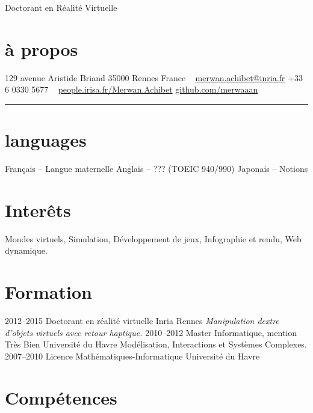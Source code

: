 \documentclass[]{friggeri-cv}
\begin{document}
       {Doctorant en Réalité Virtuelle}
			
\begin{aside}
  \section{à propos}\vspace{.25cm}
    129 avenue Aristide Briand
    35000 Rennes
    France
    ~
    \href{mailto:merwan.achibet@inria.fr}{merwan.achibet@inria.fr}
    +33 6 0330 5677
		~
    \href{http://people.irisa.fr/Merwan.Achibet/}{people.irisa.fr/Merwan.Achibet}
    \href{http://github.com/merwaaan}{github.com/merwaaan}
    {\color{lightergray}\rule{3cm}{0.01cm}}
	\section{languages}\vspace{.25cm}
		Français {\footnotesize -- Langue maternelle}\vspace{.4cm}
		Anglais {\footnotesize -- ???}
		{\footnotesize (TOEIC 940/990)}\vspace{.4cm}
		Japonais {\footnotesize -- Notions}
\end{aside}

\section{Interêts}

Mondes virtuels, Simulation, Développement de jeux, Infographie et rendu, Web dynamique.

\section{Formation}

\begin{entrylist}
  \entry
    {2012–2015}
    {Doctorant en réalité virtuelle}
    {Inria Rennes}
    {\it Manipulation dextre d’objets virtuels avec retour haptique.}
  \entry
    {2010–2012}
    {Master Informatique, mention Très Bien}
    {Université du Havre}
    {Modélisation, Interactions et Systèmes Complexes.}
  \entry
    {2007–2010}
    {Licence Mathématiques-Informatique}
    {Université du Havre}
    {}
\end{entrylist}

\section{Compétences}
\end{document}
